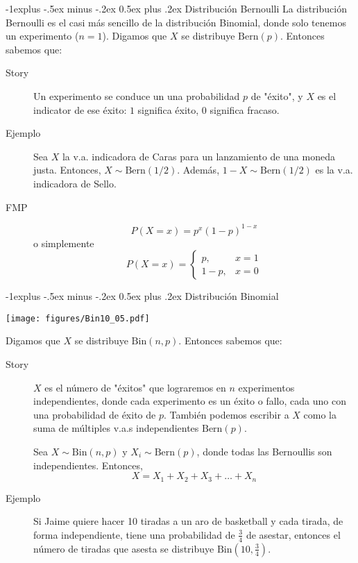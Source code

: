 \documentclass[12,landscape]{article}
\makeatletter
\newcommand{\Bern}{\textrm{Bern}}
\newcommand{\Bin}{\textrm{Bin}}
\renewcommand{\subsection}{\@startsection{subsection}{2}{0mm}%
                                {-1explus -.5ex minus -.2ex}%
                                {0.5ex plus .2ex}%
                                {\normalfont\normalsize\bfseries}}
\makeatother
\begin{document}
\begin{multicols*}{3}
\subsection{Distribución Bernoulli} La distribución Bernoulli es el casi más sencillo de la distribución Binomial, donde solo tenemos un experimento ($n=1$). Digamos que $X$ se distribuye $\Bern(p)$. Entonces sabemos que:
\begin{description}
    \item[Story] Un experimento se conduce un una probabilidad $p$ de "éxito", y $X$ es el indicator de ese éxito: $1$ significa éxito, $0$ significa fracaso.
    \item[Ejemplo] Sea $X$ la v.a. indicadora de Caras para un lanzamiento de una moneda justa. Entonces, $X \sim \Bern(1/2)$. Además, $1 - X \sim \Bern(1/2)$ es la v.a. indicadora de Sello.
    \item[FMP] 
    \[P(X = x) = p^x(1-p)^{1-x}\]
    o simplemente
    \[P(X = x) = \begin{cases} p, & x = 1 \\ 1-p, & x = 0 \end{cases}\]
\end{description}

\subsection{Distribución Binomial} 
\begin{minipage}{\linewidth}
            \centering
\texttt{[image: figures/Bin10\_05.pdf]}
        \end{minipage}

Digamos que $X$ se distribuye $\Bin(n,p)$. Entonces sabemos que:
\begin{description}
    \item[Story] $X$ es el número de "éxitos" que lograremos en $n$ experimentos independientes, donde cada experimento es un éxito o fallo, cada uno con una probabilidad de éxito de $p$. También podemos escribir a $X$ como la suma de múltiples v.a.s independientes $\Bern(p)$. 
    
    Sea $X \sim \Bin(n,p)$ y $X_i \sim \Bern(p)$, donde todas las Bernoullis son independientes. Entonces, 
        \[X = X_1 + X_2 + X_3 + \dots + X_n\]
    \item[Ejemplo] Si Jaime quiere hacer 10 tiradas a un aro de basketball y cada tirada, de forma independiente, tiene una probabilidad de $\frac{3}{4}$ de asestar, entonces el número de tiradas que asesta se distribuye $\Bin(10,\frac{3}{4})$.
    

\end{description}
\end{multicols*}
\end{document}
